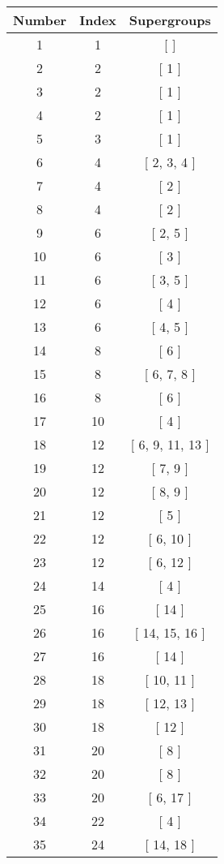 \begin{center}
\begin{longtable}[H]{|| c c c ||}
\hline
Number & Index & Supergroups \\ 
\hline
1 & 1 & [  ] \\ 
\hline
2 & 2 & [ 1 ] \\ 
\hline
3 & 2 & [ 1 ] \\ 
\hline
4 & 2 & [ 1 ] \\ 
\hline
5 & 3 & [ 1 ] \\ 
\hline
6 & 4 & [ 2, 3, 4 ] \\ 
\hline
7 & 4 & [ 2 ] \\ 
\hline
8 & 4 & [ 2 ] \\ 
\hline
9 & 6 & [ 2, 5 ] \\ 
\hline
10 & 6 & [ 3 ] \\ 
\hline
11 & 6 & [ 3, 5 ] \\ 
\hline
12 & 6 & [ 4 ] \\ 
\hline
13 & 6 & [ 4, 5 ] \\ 
\hline
14 & 8 & [ 6 ] \\ 
\hline
15 & 8 & [ 6, 7, 8 ] \\ 
\hline
16 & 8 & [ 6 ] \\ 
\hline
17 & 10 & [ 4 ] \\ 
\hline
18 & 12 & [ 6, 9, 11, 13 ] \\ 
\hline
19 & 12 & [ 7, 9 ] \\ 
\hline
20 & 12 & [ 8, 9 ] \\ 
\hline
21 & 12 & [ 5 ] \\ 
\hline
22 & 12 & [ 6, 10 ] \\ 
\hline
23 & 12 & [ 6, 12 ] \\ 
\hline
24 & 14 & [ 4 ] \\ 
\hline
25 & 16 & [ 14 ] \\ 
\hline
26 & 16 & [ 14, 15, 16 ] \\ 
\hline
27 & 16 & [ 14 ] \\ 
\hline
28 & 18 & [ 10, 11 ] \\ 
\hline
29 & 18 & [ 12, 13 ] \\ 
\hline
30 & 18 & [ 12 ] \\ 
\hline
31 & 20 & [ 8 ] \\ 
\hline
32 & 20 & [ 8 ] \\ 
\hline
33 & 20 & [ 6, 17 ] \\ 
\hline
34 & 22 & [ 4 ] \\ 
\hline
35 & 24 & [ 14, 18 ] \\ 

\end{longtable}
\end{center}
